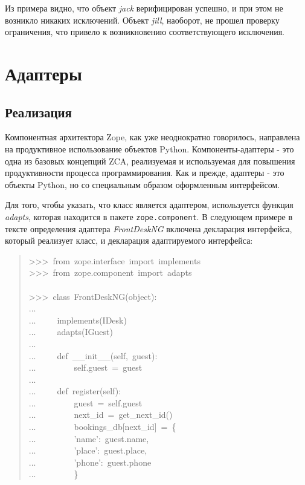 \documentclass[14pt,a4paper,openany,twoside,final]{extbook}
\providecommand*{\DUroletitlereference}[1]{\textsl{#1}}
\begin{document}
Из примера видно, что объект \DUroletitlereference{jack} верифицирован успешно, и при этом
не возникло никаких исключений.  Объект \DUroletitlereference{jill}, наоборот, не прошел
проверку ограничения, что привело к возникновению соответствующего
исключения.


\chapter{Адаптеры%
  \label{id33}%
}


\section{Реализация%
  \label{id34}%
}

Компонентная архитектора Zope, как уже неоднократно говорилось,
направлена на продуктивное использование объектов Python.
Компоненты-адаптеры - это одна из базовых концепций ZCA, реализуемая и
используемая для повышения продуктивности процесса программирования.
Как и прежде, адаптеры - это объекты Python, но со специальным образом
оформленным интерфейсом.

Для того, чтобы указать, что класс является адаптером, используется
функция \DUroletitlereference{adapts}, которая находится в пакете \texttt{zope.component}.  В
следующем примере в тексте определения адаптера \DUroletitlereference{FrontDeskNG} включена
декларация интерфейса, который реализует класс, и декларация
адаптируемого интерфейса:

\begin{quote}{\ttfamily \raggedright \noindent
>{}>{}>~from~zope.interface~import~implements\\
>{}>{}>~from~zope.component~import~adapts\\
~\\
>{}>{}>~class~FrontDeskNG(object):\\
...\\
...~~~~~implements(IDesk)\\
...~~~~~adapts(IGuest)\\
...\\
...~~~~~def~\_\_init\_\_(self,~guest):\\
...~~~~~~~~~self.guest~=~guest\\
...\\
...~~~~~def~register(self):\\
...~~~~~~~~~guest~=~self.guest\\
...~~~~~~~~~next\_id~=~get\_next\_id()\\
...~~~~~~~~~bookings\_db{[}next\_id{]}~=~\{\\
...~~~~~~~~~'name':~guest.name,\\
...~~~~~~~~~'place':~guest.place,\\
...~~~~~~~~~'phone':~guest.phone\\
...~~~~~~~~~\}
}
\end{quote}
\end{document}
